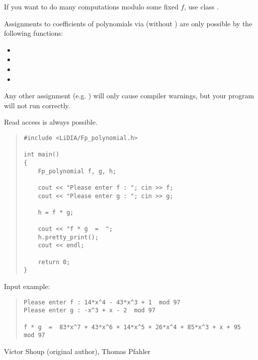 
\NOTES

If you want to do many computations modulo some fixed  $f$, use class
.



\WARNINGS

Assignments to coefficients of polynomials via  (without
) are only possible by the following functions:
\begin{itemize}
\item {}
\item {}
\item {}
\item {}
\end{itemize}
Any other assignment (e.g. ) will only cause compiler warnings, but your
program will not run correctly.

Read access is always possible.



\EXAMPLES

\begin{quote}
\begin{verbatim}
#include <LiDIA/Fp_polynomial.h>

int main()
{
    Fp_polynomial f, g, h;

    cout << "Please enter f : "; cin >> f;
    cout << "Please enter g : "; cin >> g;

    h = f * g;

    cout << "f * g  =  ";
    h.pretty_print();
    cout << endl;

    return 0;
}
\end{verbatim}
\end{quote}

Input example:
\begin{quote}
\begin{verbatim}
Please enter f : 14*x^4 - 43*x^3 + 1  mod 97
Please enter g : -x^3 + x - 2  mod 97

f * g  =  83*x^7 + 43*x^6 + 14*x^5 + 26*x^4 + 85*x^3 + x + 95 mod 97
\end{verbatim}
\end{quote}



\AUTHOR

Victor Shoup (original author), Thomas Pfahler

